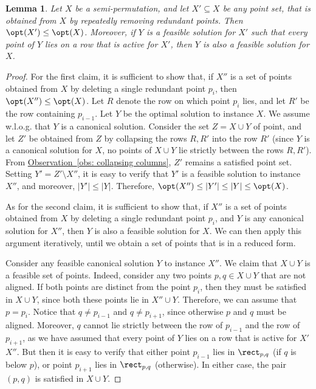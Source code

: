\documentclass[11pt]{article}
\numberwithin{equation}{section}
\newtheorem{lemma}[theorem]{Lemma}
\theoremstyle{definition}
\theoremstyle{plain}
\newcommand{\expref}[2]{\hyperref[#2]{#1~\ref{#2}}}
\begin{document}
\begin{lemma}\label{lem: reduced point set} 
	Let $X$ be a semi-permutation, and let $X' \subseteq X$ be any point set, that is obtained from $X$ by repeatedly removing redundant points.  Then $\opt(X')\leq \opt(X)$. Moreover, if $Y$ is a feasible solution for $X'$ such that every point of $Y$ lies on a row that is active for $X'$, then $Y$ is also a feasible solution for $X$.
\end{lemma}
\begin{proof}
For the first claim, it is sufficient to show that, if $X''$ is a set of points obtained from $X$ by deleting a single redundant point $p_i$, then $\opt(X'')\leq \opt(X)$. Let $R$ denote the row on which point $p_i$ lies, and let $R'$ be the row containing $p_{i-1}$. Let $Y$ be the optimal solution to instance $X$. We assume w.l.o.g. that $Y$ is a canonical solution. Consider the set $Z=X\cup Y$ of point, and let $Z'$ be obtained from $Z$ by collapsing the rows $R,R'$ into the row $R'$ (since $Y$ is a canonical solution for $X$, no points of $X\cup Y$ lie strictly between the rows $R,R'$). From \expref{Observation}{obs: collapsing columns}, $Z'$ remains a satisfied point set. Setting $Y'=Z'\setminus X''$, it is easy to verify that $Y'$ is a feasible solution to instance $X''$, and moreover, $|Y'|\leq |Y|$. Therefore, $\opt(X'')\leq |Y'|\leq |Y|\leq \opt(X)$.


As for the second claim, it is sufficient to show that, if $X''$ is a set of points obtained from $X$ by deleting a single redundant point $p_i$, and $Y$ is any canonical solution for $X''$, then $Y$ is also a feasible solution for $X$. We can then apply this argument iteratively, until we obtain a set of points that is in a reduced form.
	
	Consider any feasible canonical solution $Y$ to instance $X''$. We claim that $X \cup Y$ is a feasible set of points. Indeed,
	consider any two points $p,q \in X \cup Y$ that are not aligned. If both points are distinct from the point $p_i$, then they must be satisfied in $X\cup Y$, since both these points lie in $X''\cup Y$. Therefore, we can assume that $p=p_i$. Notice that $q \neq p_{i-1}$ and  $q \neq p_{i+1}$, since otherwise $p$ and $q$ must be aligned. Moreover, $q$ cannot lie strictly between the row of $p_{i-1}$ and the row of $p_{i+1}$, as we have assumed that every point of $Y$ lies on a row that is active for $X'$ $X''$. But then it is easy to verify that either point $p_{i-1}$ lies in $\rect_{p,q}$ (if $q$ is below $p$), or point $p_{i+1}$ lies in $\rect_{p,q}$ (otherwise). In either case, the pair $(p,q)$ is satisfied in $X\cup Y$.    
\end{proof}
\end{document}
